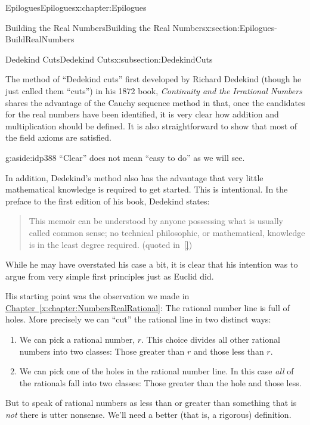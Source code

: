 \begin{chapterptx}{Epilogues}{}{Epilogues}{}{}{x:chapter:Epilogues}
\begin{sectionptx}{Building the Real Numbers}{}{Building the Real Numbers}{}{}{x:section:Epilogues-BuildRealNumbers}
\begin{subsectionptx}{Dedekind Cuts}{}{Dedekind Cuts}{}{}{x:subsection:DedekindCuts}
			\par
			The method of ``Dedekind cuts'' first developed by Richard Dedekind  (though he just called them ``cuts'') in his 1872 book, \emph{Continuity and the Irrational Numbers} shares the advantage of the Cauchy sequence method in that, once the candidates for the real numbers have been identified, it is very clear how addition and multiplication should be defined. It is also straightforward to show that most of the field axioms are satisfied.%
			\begin{aside}{}{g:aside:idp388}%
				``Clear'' does not mean ``easy to do'' as we will see.%
			\end{aside}
			In addition, Dedekind's method also has the advantage that very little mathematical knowledge is required to get started. This is intentional. In the preface to the first edition of his book, Dedekind  states:%
			\begin{quote}%
				This memoir can be understood by anyone possessing what is usually called common sense; no technical philosophic, or mathematical, knowledge is in the least degree required. (quoted in~\hyperlink{x:biblio:hawking05__god_creat_integ}{[{}]})%
			\end{quote}
			While he may have overstated his case a bit, it is clear that his intention was to argue from very simple first principles just as Euclid did.%
			\par
			His starting point was the observation we made in \hyperref[x:chapter:NumbersRealRational]{Chapter~{\xreffont\ref{x:chapter:NumbersRealRational}}}: The rational number line is full of holes. More precisely we can ``cut'' the rational line in two distinct ways:%
			\begin{enumerate}
				\item{}We can pick a rational number, \(r\). This choice divides all other rational numbers into two classes: Those greater than \(r\) and those less than \(r\).%
				\item{}We can pick one of the holes in the rational number line. In this case \emph{all} of the rationals fall into two classes: Those greater than the hole and those less.%
			\end{enumerate}
			\par
			But to speak of rational numbers as less than or greater than something that is \emph{not} there is utter nonsense. We'll need a better (that is, a rigorous) definition.%
			\par

\end{subsectionptx}
\end{sectionptx}
\end{chapterptx}
